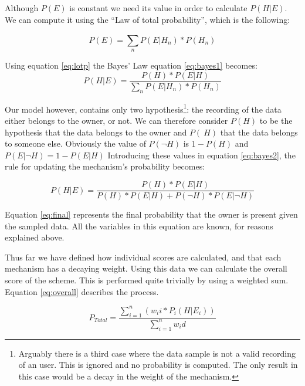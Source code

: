 Although $P(E)$ is constant we need its value in order to calculate $P(H|E)$. We can compute it using the ``Law of total probability'', which is the following:

\begin{equation} 
\label{eq:lotp}
P(E) = \sum_{n}^{}P(E|H_n) * P(H_n)
\end{equation}

Using equation \ref{eq:lotp} the Bayes' Law equation \ref{eq:bayes1} becomes:
\begin{equation} 
\label{eq:bayes2}
P(H|E) = \frac{P(H) * P(E|H)}{\sum_{n}^{}P(E|H_n) * P(H_n)}
\end{equation}

Our model however, contains only two hypothesis\footnote{Arguably there is a third case where the data sample is not a valid recording of an user. This is ignored and no probability is computed. The only result in this case would be a decay in the weight of the mechanism.}: the recording of the data either belongs to the owner, or not. We can therefore consider $P(H)$ to be the hypothesis that the data belongs to the owner and $P(~H)$ that the data belongs to someone else. Obviously the value of $P(\neg H)$ is $1 - P(H)$ and $P(E|\neg H) = 1 - P(E|H)$ Introducing these values in equation \ref{eq:bayes2}, the rule for updating the mechanism's probability becomes:

\begin{equation} 
\label{eq:final}
P(H|E) = \frac{P(H) * P(E|H)}{P(H) * P(E|H) + P(\neg H) * P(E|\neg H)}
\end{equation}

Equation \ref{eq:final} represents the final probability that the owner is present given the sampled data. All the variables in this equation are known, for reasons explained above.

Thus far we have defined how individual scores are calculated, and that each mechanism has a decaying weight. Using this data we can calculate the overall score of the scheme. This is performed quite trivially by using a weighted sum. Equation \ref{eq:overall} describes the process. 

\begin{equation} 
\label{eq:overall}
P_{Total} = \frac{\sum_{i=1}^{n}(w_ii * P_i(H|E_i))}{\sum_{i=1}^{n}w_id}
\end{equation}




